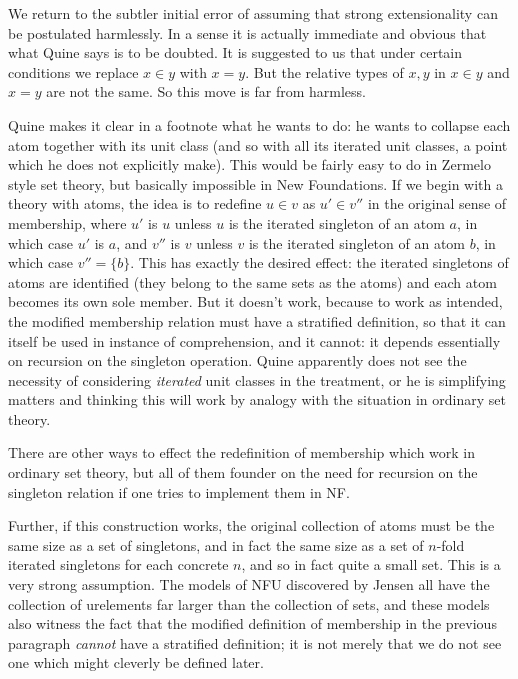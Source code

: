 \documentclass[12pt]{article}
\begin{document}
We return to the subtler initial error of assuming that strong extensionality can be postulated harmlessly.   In a sense it is actually immediate and obvious that what Quine says is to be doubted.  It is suggested to us that under certain conditions we replace $x \in y$ with $x=y$.  But the relative types of $x,y$ in $x \in y$ and $x=y$ are not the same.  So this move is far from harmless.   

Quine makes it clear in a footnote what he wants to do:  he wants to collapse each atom together with its unit class (and so with all its iterated unit classes, a point which he does not explicitly make).   This would be fairly easy to do in Zermelo style set theory, but basically impossible in New Foundations.  If we begin with a theory with atoms, the idea is to redefine $u \in v$ as $u' \in v''$ in the original sense of membership, where $u'$ is $u$ unless $u$ is the iterated singleton of an atom $a$, in which case $u'$ is $a$, and $v''$ is $v$ unless $v$ is the iterated singleton of an atom $b$, in which case $v'' = \{b\}$.  This has exactly the desired effect:  the iterated singletons of atoms are identified
(they belong to the same sets as the atoms) and each atom becomes its own sole member.  But it doesn't work, because to work as intended, the modified membership relation must have a stratified definition, so that it can itself be used in instance of comprehension, and it cannot:  it depends essentially on recursion on the singleton operation.  Quine apparently does not see the necessity of considering {\em iterated\/} unit classes in the treatment, or he is simplifying matters and thinking this will work by analogy with the situation in ordinary set theory.

There are other ways to effect the redefinition of membership which work in ordinary set theory, but all of them founder on the need for recursion on the singleton relation if one tries to implement them in NF.

 Further,
if this construction works, the original collection of atoms must be the same size as a set of singletons, and in fact the same size as a set of $n$-fold iterated singletons for each concrete $n$, and so in fact quite a small set.  This is a very strong assumption.  The models of NFU discovered by Jensen all have the collection of urelements far larger than the collection of sets, and these models also witness the fact that the modified definition of membership in the previous paragraph {\em cannot\/} have a stratified definition;  it is not merely that we do not see one which might cleverly be defined later.
\end{document}
